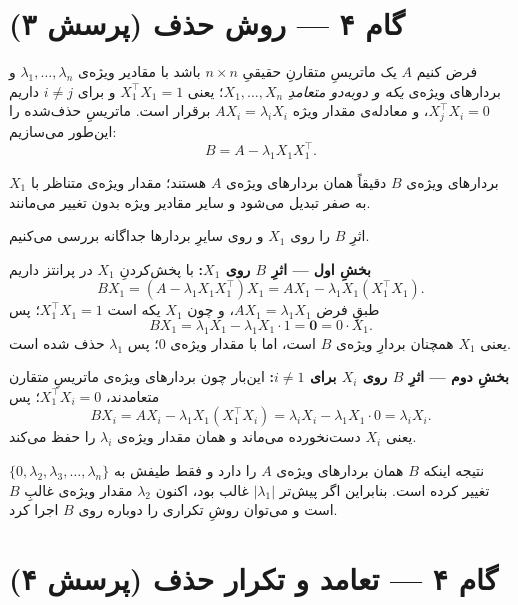 \documentclass[14pt]{extarticle}
\newcommand{\T}{^{\top}}
\begin{document}
\newpage
\section{گام ۴ --- روش حذف (پرسش ۳)}

فرض کنیم $A$ یک ماتریسِ متقارنِ حقیقیِ $n\times n$ باشد با مقادیر ویژه‌ی
$\lambda_1,\dots,\lambda_n$ و بردارهای ویژه‌ی \emph{یکه و دوبه‌دو متعامدِ}
$X_1,\dots,X_n$؛ یعنی $X_1\T X_1=1$ و برای $i\neq j$ داریم $X_j\T X_i=0$، و معادله‌ی مقدار ویژه $A X_i=\lambda_i X_i$ برقرار است. ماتریسِ حذف‌شده را این‌طور می‌سازیم:
\[
B = A - \lambda_1 X_1 X_1\T .
\]

\begin{claimx}
بردارهای ویژه‌ی $B$ دقیقاً همان بردارهای ویژه‌ی $A$ هستند؛ مقدار ویژه‌ی متناظر با $X_1$
به صفر تبدیل می‌شود و سایر مقادیر ویژه بدون تغییر می‌مانند.
\end{claimx}

\begin{proofx}
اثرِ $B$ را روی $X_1$ و روی سایرِ بردارها جداگانه بررسی می‌کنیم.

\textbf{بخشِ اول --- اثرِ $B$ روی $X_1$:} با پخش‌کردنِ $X_1$ در پرانتز داریم
\[
B X_1 = (A-\lambda_1 X_1 X_1\T)X_1 = A X_1 - \lambda_1 X_1 (X_1\T X_1).
\]
طبقِ فرض $A X_1=\lambda_1 X_1$، و چون $X_1$ یکه است $X_1\T X_1=1$؛ پس
\[
B X_1 = \lambda_1 X_1 - \lambda_1 X_1\cdot 1 = \mathbf{0}=0\cdot X_1 .
\]
یعنی $X_1$ همچنان بردارِ ویژه‌ی $B$ است، اما با مقدار ویژه‌ی $0$؛ پس $\lambda_1$ حذف شده است.

\textbf{بخشِ دوم --- اثرِ $B$ روی $X_i$ برای $i\neq 1$:} این‌بار چون بردارهای ویژه‌ی ماتریسِ متقارن متعامدند، $X_1\T X_i=0$؛ پس
\[
B X_i = A X_i - \lambda_1 X_1 (X_1\T X_i) = \lambda_i X_i - \lambda_1 X_1\cdot 0 = \lambda_i X_i .
\]
یعنی $X_i$ دست‌نخورده می‌ماند و همان مقدار ویژه‌ی $\lambda_i$ را حفظ می‌کند.

نتیجه اینکه $B$ همان بردارهای ویژه‌ی $A$ را دارد و فقط طیفش به
$\{0,\lambda_2,\lambda_3,\dots,\lambda_n\}$ تغییر کرده است. بنابراین اگر پیش‌تر $|\lambda_1|$ غالب بود،
اکنون $\lambda_2$ مقدار ویژه‌ی غالبِ $B$ است و می‌توان روشِ تکراری را دوباره روی $B$ اجرا کرد.
\end{proofx}

\newpage
\section{گام ۴ --- تعامد و تکرار حذف (پرسش ۴)}
\end{document}
